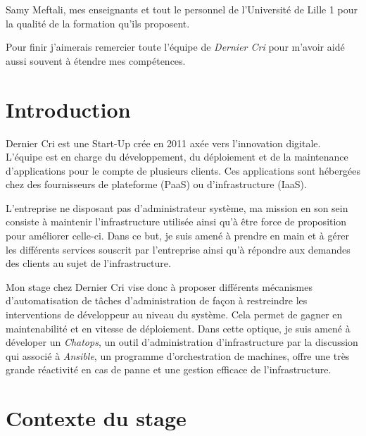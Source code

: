 \documentclass[12pt,a4paper]{article}
\begin{document}
  \bigskip

  Samy Meftali, mes enseignants et tout le personnel de l'Université de
  Lille 1 pour la qualité de la formation qu'ils proposent.

  \bigskip

  Pour finir j'aimerais remercier toute l'équipe de \emph{Dernier Cri}
  pour m'avoir aidé aussi souvent à étendre mes compétences.

  \newpage

  \section{Introduction}\label{introduction}

  \bigskip

  Dernier Cri est une Start-Up crée en 2011 axée vers l'innovation
  digitale. L'équipe est en charge du développement, du déploiement et de
  la maintenance d'applications pour le compte de plusieurs clients. Ces
  applications sont hébergées chez des fournisseurs de plateforme (PaaS)
  ou d'infrastructure (IaaS).

  \bigskip

  L'entreprise ne disposant pas d'administrateur système, ma mission en
  son sein consiste à maintenir l'infrastructure utilisée ainsi qu'à être
  force de proposition pour améliorer celle-ci. Dans ce but, je suis amené
  à prendre en main et à gérer les différents services souscrit par
  l'entreprise ainsi qu'à répondre aux demandes des clients au sujet de
  l'infrastructure.

  \bigskip

  Mon stage chez Dernier Cri vise donc à proposer différents mécanismes
  d'automatisation de tâches d'administration de façon à restreindre les
  interventions de développeur au niveau du système. Cela permet de gagner
  en maintenabilité et en vitesse de déploiement. Dans cette optique, je
  suis amené à déveloper un \emph{Chatops}, un outil d'administration
  d'infrastructure par la discussion qui associé à \emph{Ansible}, un
  programme d'orchestration de machines, offre une très grande réactivité
  en cas de panne et une gestion efficace de l'infrastructure.

  \newpage

  \section{Contexte du stage}\label{contexte-du-stage}
\end{document}
